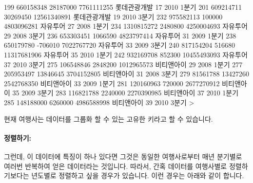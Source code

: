 \documentclass[tutorial.tex]{subfiles}
\begin{document}
\begin{Schunk}
\begin{Soutput}
199  660158348   28187000  7761111255 롯데관광개발   17 2010 1분기
201  609214711   30269450 12561340891 롯데관광개발   19 2010 3분기
232  975582113     100000  4803096281     자유투어   27 2008 1분기
234 1310815272    2480800  4250004693     자유투어   29 2008 3분기
236  653303451    1066590  4823797414     자유투어   31 2009 1분기
238  650179780    -706010  7022767720     자유투어   33 2009 3분기
240  817154204     516680 11317681906     자유투어   35 2010 1분기
242  932169708     852300 10455493093     자유투어   37 2010 3분기
275  106548846    2848200  1012965573   비티앤아이   29 2008 1분기
277  205953497   13846645  3704152805   비티앤아이   31 2008 3분기
279   81561788   13427260  2542768350   비티앤아이   33 2009 1분기
281  120160963     720000  2677270912   비티앤아이   35 2009 3분기
283  116821788    2240000  2270390985   비티앤아이   37 2010 1분기
285  148188000    6260000  4986588998   비티앤아이   39 2010 3분기
> 
\end{Soutput}
\end{Schunk}

현재 여행사는 데이터를 그룹화 할 수 있는 고유한 키라고 할 수 있습니다. 

\paragraph{정렬하기:}
그런데, 이 데이터에 특징이 하나 있다면 그것은 동일한 여행사로부터 매년 분기별로 여러번 반복하여 얻은 데이터라는 것입니다. 
따라서, 간혹 데이터를 여행사별로 정렬하기보다는 년도별로 정렬하고 싶을 경우가 있습니다.
이런 경우는 아래와 같이 합니다. 
\end{document}
